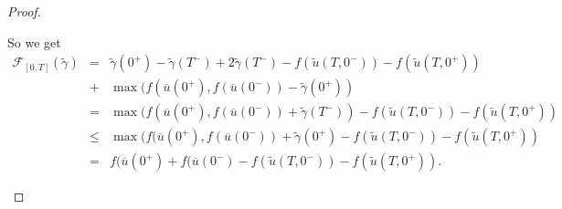 \documentclass[a4paper, 10pt, final]{article}
\begin{document}
\begin{proof}
\begin{enumerate}
So we get 
  \begin{eqnarray*}
   \mathcal F_{[0,T]}(\widetilde \gamma)  
    &=&  \widetilde\gamma(0^+)-\widetilde\gamma(T^-)+2\widetilde\gamma(T^-)- f(\widetilde u(T,0^-)) -f(\widetilde u(T,0^+))\\ &+& \max( f(\overline u(0^+),f(\overline u(0^-))-\widetilde\gamma(0^+)) \\ &=&  \max( f(\overline u(0^+),f(\overline u(0^-))+\widetilde\gamma(T^-))- f(\widetilde u(T,0^-))  - f(\widetilde u(T,0^+))
    \\ &\leq &  \max( f(\overline u(0^+),f(\overline u(0^-))+\widetilde\gamma(0^+)- f(\widetilde u(T,0^-))  - f(\widetilde u(T,0^+))\\ &=&    f(\overline u(0^+)+f(\overline u(0^-) - f(\widetilde u(T,0^-))  - f(\widetilde u(T,0^+)).
  \end{eqnarray*}
\end{enumerate}
  \end{proof}
\end{document}
